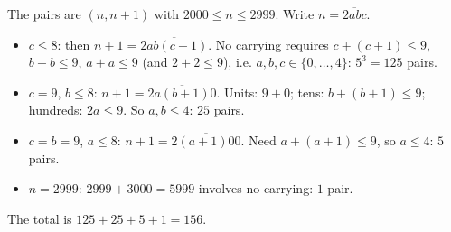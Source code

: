 The pairs are $(n,n+1)$ with $2000\le n\le2999$. Write $n=\overline{2abc}$.
\begin{itemize}
\item $c\le8$: then $n+1=\overline{2ab(c+1)}$. No carrying requires $c+(c+1)\le9$, $b+b\le9$, $a+a\le9$ (and $2+2\le9$), i.e. $a,b,c\in\{0,\ldots,4\}$: $5^3=125$ pairs.
\item $c=9$, $b\le8$: $n+1=\overline{2a(b+1)0}$. Units: $9+0$; tens: $b+(b+1)\le9$; hundreds: $2a\le9$. So $a,b\le4$: $25$ pairs.
\item $c=b=9$, $a\le8$: $n+1=\overline{2(a+1)00}$. Need $a+(a+1)\le9$, so $a\le4$: $5$ pairs.
\item $n=2999$: $2999+3000=5999$ involves no carrying: $1$ pair.
\end{itemize}
The total is $125+25+5+1=\boxed{156}$.
